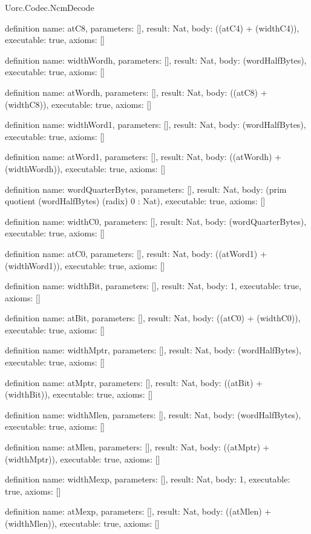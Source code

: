 \begin{lexlean}{Uorc.Codec.NcmDecode}
\begin{semanticmodule}
definition{
  name: atC8,
  parameters: [],
  result: Nat,
  body: ((atC4) + (widthC4)),
  executable: true,
  axioms: []
}

definition{
  name: widthWordh,
  parameters: [],
  result: Nat,
  body: (wordHalfBytes),
  executable: true,
  axioms: []
}

definition{
  name: atWordh,
  parameters: [],
  result: Nat,
  body: ((atC8) + (widthC8)),
  executable: true,
  axioms: []
}

definition{
  name: widthWord1,
  parameters: [],
  result: Nat,
  body: (wordHalfBytes),
  executable: true,
  axioms: []
}

definition{
  name: atWord1,
  parameters: [],
  result: Nat,
  body: ((atWordh) + (widthWordh)),
  executable: true,
  axioms: []
}

definition{
  name: wordQuarterBytes,
  parameters: [],
  result: Nat,
  body: (prim quotient (wordHalfBytes) (radix) 0 : Nat),
  executable: true,
  axioms: []
}

definition{
  name: widthC0,
  parameters: [],
  result: Nat,
  body: (wordQuarterBytes),
  executable: true,
  axioms: []
}

definition{
  name: atC0,
  parameters: [],
  result: Nat,
  body: ((atWord1) + (widthWord1)),
  executable: true,
  axioms: []
}

definition{
  name: widthBit,
  parameters: [],
  result: Nat,
  body: 1,
  executable: true,
  axioms: []
}

definition{
  name: atBit,
  parameters: [],
  result: Nat,
  body: ((atC0) + (widthC0)),
  executable: true,
  axioms: []
}

definition{
  name: widthMptr,
  parameters: [],
  result: Nat,
  body: (wordHalfBytes),
  executable: true,
  axioms: []
}

definition{
  name: atMptr,
  parameters: [],
  result: Nat,
  body: ((atBit) + (widthBit)),
  executable: true,
  axioms: []
}

definition{
  name: widthMlen,
  parameters: [],
  result: Nat,
  body: (wordHalfBytes),
  executable: true,
  axioms: []
}

definition{
  name: atMlen,
  parameters: [],
  result: Nat,
  body: ((atMptr) + (widthMptr)),
  executable: true,
  axioms: []
}

definition{
  name: widthMexp,
  parameters: [],
  result: Nat,
  body: 1,
  executable: true,
  axioms: []
}

definition{
  name: atMexp,
  parameters: [],
  result: Nat,
  body: ((atMlen) + (widthMlen)),
  executable: true,
  axioms: []
}


\end{semanticmodule}
\end{lexlean}
